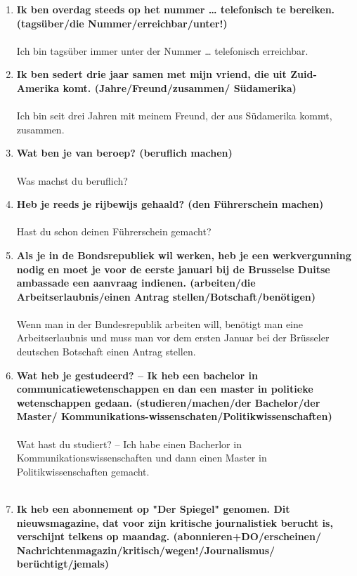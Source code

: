 \documentclass[main.tex]{subfiles}
\begin{document}
\begin{enumerate}
\item \textbf{Ik ben overdag steeds op het nummer … telefonisch te bereiken. (tagsüber/die Nummer/erreichbar/unter!)}\\ \\
Ich bin tagsüber immer unter der Nummer … telefonisch erreichbar. 
\\
\item \textbf{Ik ben sedert drie jaar samen met mijn vriend, die uit Zuid-Amerika komt. (Jahre/Freund/zusammen/ Südamerika)}\\ \\
Ich bin seit drei Jahren mit meinem Freund, der aus Südamerika kommt, zusammen.
\\
\item \textbf{Wat ben je van beroep? (beruflich machen)}\\ \\
Was machst du beruflich?
\\
\item \textbf{Heb je reeds je rijbewijs gehaald? (den Führerschein machen)}\\ \\
Hast du schon deinen Führerschein gemacht? 
\\
\item \textbf{Als je in de Bondsrepubliek wil werken, heb je een werkvergunning nodig en moet je voor de eerste januari bij de Brusselse Duitse ambassade een aanvraag indienen. (arbeiten/die Arbeitserlaubnis/einen Antrag stellen/Botschaft/benötigen)}\\ \\
Wenn man in der Bundesrepublik arbeiten will, benötigt man eine Arbeitserlaubnis und muss man vor dem ersten Januar bei der Brüsseler deutschen Botschaft einen Antrag stellen.
\\
\item \textbf{Wat heb je gestudeerd? – Ik heb een bachelor in communicatiewetenschappen en dan een master in politieke wetenschappen gedaan. (studieren/machen/der Bachelor/der Master/ Kommunikations-wissenschaten/Politikwissenschaften)}\\ \\
Wat hast du studiert? – Ich habe einen Bacherlor in Kommunikationswissenschaften und dann einen Master in Politikwissenschaften gemacht.
\\
\\
\item \textbf{Ik heb een abonnement op "Der Spiegel" genomen. Dit nieuwsmagazine, dat voor zijn kritische journalistiek berucht is, verschijnt telkens op maandag. (abonnieren+DO/erscheinen/ Nachrichtenmagazin/kritisch/wegen!/Journalismus/ berüchtigt/jemals)}\\ \\

\end{enumerate}
\end{document}
